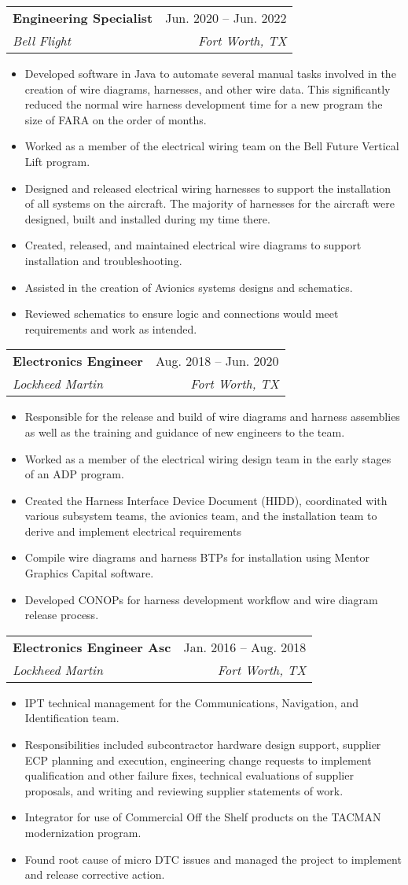 \documentclass[letterpaper,11pt]{article}
\makeatletter
\newcommand{\resumeItem}[1]{
  \item\small{
    {#1 \vspace{-2pt}}
  }
}
\newcommand{\resumeSubheading}[4]{
  \vspace{-2pt}\item
    \begin{tabular*}{0.97\textwidth}[t]{l@{\extracolsep{\fill}}r}
      \textbf{#1} & #2 \\
      \textit{\small#3} & \textit{\small #4} \\
    \end{tabular*}\vspace{-7pt}
}
\newcommand{\resumeItemListStart}{\begin{itemize}}
\newcommand{\resumeItemListEnd}{\end{itemize}\vspace{-5pt}}
\makeatother
\begin{document}
    \resumeSubheading
      {Engineering Specialist}{Jun. 2020 -- Jun. 2022}
      {Bell Flight}{Fort Worth, TX}
      \resumeItemListStart
        \resumeItem{Developed software in Java to automate several manual tasks involved in the creation of wire diagrams, harnesses, and other wire data. This significantly reduced the normal wire harness development time for a new program the size of FARA on the order of months.}
        \resumeItem{Worked as a member of the electrical wiring team on the Bell Future Vertical Lift program.}
        \resumeItem{Designed and released electrical wiring harnesses to support the installation of all systems on the aircraft. The majority of harnesses for the aircraft were designed, built and installed during my time there. }
        \resumeItem{Created, released, and maintained electrical wire diagrams to support installation and troubleshooting.}
        \resumeItem{Assisted in the creation of Avionics systems designs and schematics.}
        \resumeItem{Reviewed schematics to ensure logic and connections would meet requirements and work as intended.}
      \resumeItemListEnd

      \resumeSubheading
      {Electronics Engineer}{Aug. 2018 -- Jun. 2020}
      {Lockheed Martin}{Fort Worth, TX}
      \resumeItemListStart
        \resumeItem{Responsible for the release and build of wire diagrams and harness assemblies as well as the training and guidance of new engineers to the team.}
        \resumeItem{Worked as a member of the electrical wiring design team in the early stages of an ADP program.}
        \resumeItem{Created the Harness Interface Device Document (HIDD), coordinated with various subsystem teams, the avionics team, and the installation team to derive and implement electrical requirements}
        \resumeItem{Compile wire diagrams and harness BTPs for installation using Mentor Graphics Capital software.}
        \resumeItem{Developed CONOPs for harness development workflow and wire diagram release process.}
      \resumeItemListEnd

      \resumeSubheading
      {Electronics Engineer Asc}{Jan. 2016 -- Aug. 2018}
      {Lockheed Martin}{Fort Worth, TX}
      \resumeItemListStart
        \resumeItem{IPT technical management for the Communications, Navigation, and Identification team. }
        \resumeItem{Responsibilities included subcontractor hardware design support, supplier ECP planning and execution, engineering change requests to implement qualification and other failure fixes, technical evaluations of supplier proposals, and writing and reviewing supplier statements of work.}
        \resumeItem{Integrator for use of Commercial Off the Shelf products on the TACMAN modernization program.}
        \resumeItem{Found root cause of micro DTC issues and managed the project to implement and release corrective action.}
      \resumeItemListEnd
\end{document}
